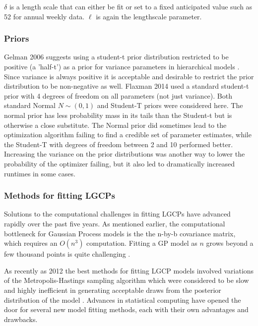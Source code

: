 $\delta$ is a length scale that can either be fit or set to a fixed anticipated value such as 52 for annual weekly data. $\ell$ is again the lengthscale parameter.\par


\subsubsection{Priors}

Gelman 2006 suggests using a student-t prior distribution restricted to be positive (a 'half-t') as a prior for variance parameters in hierarchical models \cite{gelman_2006}. Since variance is always positive it is acceptable and desirable to restrict the prior distribution to be non-negative as well. Flaxman 2014 used a standard student-t prior with 4 degrees of freedom on all parameters (not just variance). Both standard Normal $N \sim (0,1)$ and Student-T priors were considered here. The normal prior has less probability mass in its tails than the Student-t but is otherwise a close substitute. The Normal prior did sometimes lead to the optimization algorithm failing to find a credible set of parameter estimates, while the Student-T with degrees of freedom between 2 and 10 performed better. Increasing the variance on the prior distributions was another way to lower the probability of the optimizer failing, but it also led to dramatically increased runtimes in some cases.

\subsubsection{Methods for fitting LGCPs}

Solutions to the computational challenges in fitting LGCPs have advanced rapidly over the past five years. As mentioned earlier, the computational bottleneck for Gaussian Process models is the the n-by-b covariance matrix, which requires an $O(n^3)$ computation. Fitting a GP model as $n$ grows beyond a few thousand points is quite challenging \cite{gelman2013bayesian}. \par

 As recently as 2012 the best methods for fitting LGCP models involved variations of the Metropolis-Hastings sampling algorithm which were considered to be slow and highly inefficient in generating acceptable draws from the posterior distribution of the model \cite{murray_2012}. Advances in statistical computing have opened the door for several new model fitting methods, each with their own advantages and drawbacks.



